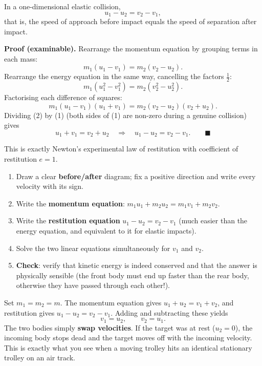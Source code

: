 \documentclass[11pt]{article}
\newcommand{\cle}[1]{{\popxbold\color{popdark}#1}}
\begin{document}
\begin{propriete}
In a one-dimensional elastic collision,
\[ u_1 - u_2 = v_2 - v_1, \]
that is, the \cle{speed of approach} before impact equals the \cle{speed of separation} after impact.
\end{propriete}

\textbf{Proof (examinable).} Rearrange the momentum equation by grouping terms in each mass:
\[ m_1(u_1 - v_1) = m_2(v_2 - u_2). \tag{1} \]
Rearrange the energy equation in the same way, cancelling the factors $\tfrac12$:
\[ m_1(u_1^2 - v_1^2) = m_2(v_2^2 - u_2^2). \]
Factorising each difference of squares:
\[ m_1(u_1 - v_1)(u_1 + v_1) = m_2(v_2 - u_2)(v_2 + u_2). \tag{2} \]
Dividing (2) by (1) (both sides of (1) are non-zero during a genuine collision) gives
\[ u_1 + v_1 = v_2 + u_2 \quad\Longrightarrow\quad u_1 - u_2 = v_2 - v_1. \qquad \blacksquare \]

This is exactly \cle{Newton's experimental law of restitution} with coefficient of restitution $e = 1$.

\begin{methode}
\begin{enumerate}
\item Draw a clear \textbf{before/after} diagram; fix a positive direction and write every velocity with its sign.
\item Write the \textbf{momentum equation}: $m_1u_1 + m_2u_2 = m_1v_1 + m_2v_2$.
\item Write the \textbf{restitution equation} $u_1 - u_2 = v_2 - v_1$ (much easier than the energy equation, and equivalent to it for elastic impacts).
\item Solve the two linear equations simultaneously for $v_1$ and $v_2$.
\item \textbf{Check}: verify that kinetic energy is indeed conserved and that the answer is physically sensible (the front body must end up faster than the rear body, otherwise they have passed through each other!).
\end{enumerate}
\end{methode}

\begin{exemplebox}
Set $m_1 = m_2 = m$. The momentum equation gives $u_1 + u_2 = v_1 + v_2$, and restitution gives $u_1 - u_2 = v_2 - v_1$. Adding and subtracting these yields
\[ v_1 = u_2, \qquad v_2 = u_1. \]
The two bodies simply \textbf{swap velocities}. If the target was at rest ($u_2 = 0$), the incoming body stops dead and the target moves off with the incoming velocity. This is exactly what you see when a moving trolley hits an identical stationary trolley on an air track.
\end{exemplebox}
\end{document}
